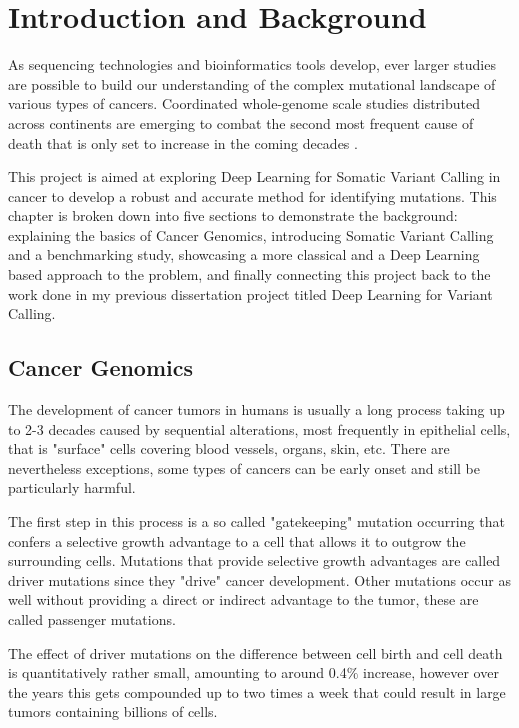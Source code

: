 \documentclass[bsc,frontabs,singlespacing,parskip,deptreport]{infthesis}
\begin{document}
\chapter{Introduction and Background}

As sequencing technologies and bioinformatics tools develop, ever larger studies are possible to build our understanding of the complex mutational landscape of various types of cancers. Coordinated whole-genome scale studies distributed across continents are emerging to combat the second most frequent cause of death that is only set to increase in the coming decades \cite{PCAWG}. 

This project is aimed at exploring Deep Learning for Somatic Variant Calling in cancer to develop a robust and accurate method for identifying mutations. This chapter is broken down into five sections to demonstrate the background: explaining the basics of Cancer Genomics, introducing Somatic Variant Calling and a benchmarking study, showcasing a more classical and a Deep Learning based approach to the problem, and finally connecting this project back to the work done in my previous dissertation project titled Deep Learning for Variant Calling.

\section{Cancer Genomics}

The development of cancer tumors in humans is usually a long process taking up to 2-3 decades caused by sequential alterations, most frequently in epithelial cells, that is "surface" cells covering blood vessels, organs, skin, etc. \cite{Vogelstein1546} There are nevertheless exceptions, some types of cancers can be early onset and still be particularly harmful.

The first step in this process is a so called "gatekeeping" mutation occurring that confers a selective growth advantage to a cell that allows it to outgrow the surrounding cells. Mutations that provide selective growth advantages are called driver mutations since they "drive" cancer development. Other mutations occur as well without providing a direct or indirect advantage to the tumor, these are called passenger mutations.

The effect of driver mutations on the difference between cell birth and cell death is quantitatively rather small, amounting to around 0.4$\%$ increase, however over the years this gets compounded up to two times a week that could result in large tumors containing billions of cells.
\end{document}
